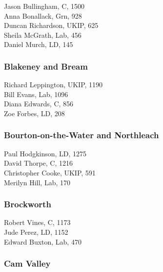 \documentclass[a4paper,openany,10pt]{book}
\begin{document}


Jason Bullingham, C, 1500\\
Anna Bonallack, Grn, 928\\
Duncan Richardson, UKIP, 625\\
Sheila McGrath, Lab, 456\\
Daniel Murch, LD, 145\\


\subsubsection*{Blakeney and Bream}



Richard Leppington, UKIP, 1190\\
Bill Evans, Lab, 1096\\
Diana Edwards, C, 856\\
Zoe Forbes, LD, 208\\


\subsubsection*{{Bourton-on-the-Water and Northleach}}



Paul Hodgkinson, LD, 1275\\
David Thorpe, C, 1216\\
Christopher Cooke, UKIP, 591\\
Merilyn Hill, Lab, 170\\


\subsubsection*{Brockworth}



Robert Vines, C, 1173\\
Jude Perez, LD, 1152\\
Edward Buxton, Lab, 470\\


\subsubsection*{Cam Valley}
\end{document}
